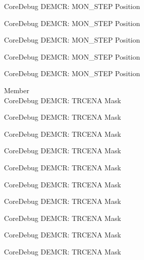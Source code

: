 \begin{DoxyRefList}
\label{deprecated__deprecated000852}%
%
Core\+Debug DEMCR\+: MON\+\_\+\+STEP Position 

\label{deprecated__deprecated000994}%
%
Core\+Debug DEMCR\+: MON\+\_\+\+STEP Position 

\label{deprecated__deprecated001070}%
%
Core\+Debug DEMCR\+: MON\+\_\+\+STEP Position 

\label{deprecated__deprecated001159}%
%
Core\+Debug DEMCR\+: MON\+\_\+\+STEP Position 

\label{deprecated__deprecated001261}%
%
Core\+Debug DEMCR\+: MON\+\_\+\+STEP Position  
\item[Member \doxylink{group___c_m_s_i_s___core_debug_ga5e99652c1df93b441257389f49407834}{Core\+Debug\+\_\+\+DEMCR\+\_\+\+TRCENA\+\_\+\+Msk} ]\hfill \\
\label{deprecated__deprecated000046}%
%
Core\+Debug DEMCR\+: TRCENA Mask 

\label{deprecated__deprecated000190}%
%
Core\+Debug DEMCR\+: TRCENA Mask 

\label{deprecated__deprecated000332}%
%
Core\+Debug DEMCR\+: TRCENA Mask 

\label{deprecated__deprecated000408}%
%
Core\+Debug DEMCR\+: TRCENA Mask 

\label{deprecated__deprecated000497}%
%
Core\+Debug DEMCR\+: TRCENA Mask 

\label{deprecated__deprecated000599}%
%
Core\+Debug DEMCR\+: TRCENA Mask 

\label{deprecated__deprecated000705}%
%
Core\+Debug DEMCR\+: TRCENA Mask 

\label{deprecated__deprecated000849}%
%
Core\+Debug DEMCR\+: TRCENA Mask 

\label{deprecated__deprecated000991}%
%
Core\+Debug DEMCR\+: TRCENA Mask 

\label{deprecated__deprecated001067}%
%
Core\+Debug DEMCR\+: TRCENA Mask 


\end{DoxyRefList}
